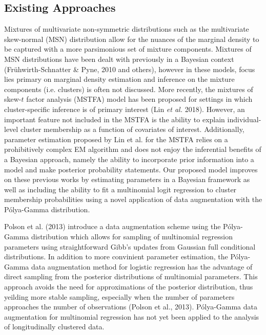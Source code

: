 \documentclass[useAMS,referee]{biom}
\begin{document}
\subsection{Existing Approaches}

Mixtures of multivariate non-symmetric distributions such as the multivariate skew-normal (MSN) distribution allow for the nuances of the marginal density to be captured with a more parsimonious set of mixture components. Mixtures of MSN distributions have been dealt with previously in a Bayesian context (Fr\"{u}hwirth-Schnatter \& Pyne, 2010 and others), however in these models, focus lies primary on marginal density estimation and inference on the mixture components (i.e. clusters) is often not discussed. More recently, the mixtures of skew-$t$ factor analysis (MSTFA) model has been proposed for settings in which cluster-specific inference is of primary interest (Lin \textit{et al.} 2018). However, an important feature not included in the MSTFA is the ability to explain individual-level cluster membership as a function of covariates of interest. Additionally, parameter estimation proposed by Lin et al. for the MSTFA relies on a prohibitively complex EM algorithm and does not enjoy the inferential benefits of a Bayesian approach, namely the ability to incorporate prior information into a model and make posterior probability statements. Our proposed model improves on these previous works by estimating parameters in a Bayesian framework as well as including the ability to fit a multinomial logit regression to cluster membership probabilities using a novel application of data augmentation with the P\'olya-Gamma distribution.

Polson et al. (2013) introduce a data augmentation scheme using the P\'olya-Gamma distribution which allows for sampling of multinomial regression parameters using straightforward Gibb's updates from Gaussian full conditional distributions. In addition to more convinient parameter estimation, the P\'olya-Gamma data augmentation method for logistic regression has the advantage of direct sampling from the posterior distributions of multinomial parameters. This approach avoids the need for approximations of the posterior distribution, thus yeilding more stable sampling, especially when the number of parameters approaches the number of observations (Polson et al., 2013). P\'olya-Gamma data augmentation for multinomial regression has not yet been applied to the analysis of longitudinally clustered data. 
\end{document}
